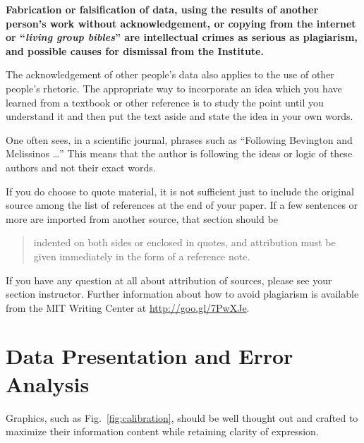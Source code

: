 \textbf{Fabrication or falsification of data, using the results of
another person's work without acknowledgement, or copying from the 
internet or ``\emph{living group bibles}'' are intellectual crimes 
as serious as plagiarism, and possible causes for dismissal from 
the Institute.}

The acknowledgement of other people's data also applies to the use
of other people's rhetoric. The appropriate way to incorporate an
idea which you have learned from a textbook or other reference is to
study the point until you understand it and then put the text aside
and state the idea in your own words.

One often sees, in a scientific journal, phrases such as ``Following
Bevington and Melissinos \cite{bevington2003, melissinos1966} \ldots''
This means that the author is following the ideas or logic of these
authors and not their exact words.

If you do choose to quote material, it is not sufficient just to
include the original source among the list of references at the end of
your paper. If a few sentences or more are imported from another
source, that section should be
\begin{quote}indented on both sides or enclosed in
quotes, and attribution must be given immediately in the form of a
reference note. \cite{melissinos1966}
\end{quote}

If you have any question at all about attribution of sources, please
see your section instructor.
Further information about how to avoid plagiarism is available
from the MIT Writing Center at 	
\url{http://goo.gl/7PwXJe}.





\section{Data Presentation and Error Analysis}


Graphics, such as Fig.~\ref{fig:calibration}, should be well
thought out and crafted to maximize their information content while
retaining clarity of expression.  

